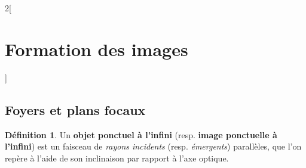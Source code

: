 \documentclass[french]{book}
\theoremstyle{definition}
\newtheorem*{definition}{Définition}
\theoremstyle{remark}
\newcommand*{\tdef}[1]{\textbf{#1}}
\newcommand*{\imp}[1]{\emph{#1}}
\begin{document}
\begin{landscape}
\begin{multicols*}{2}[\section{Formation des images}]
\subsection{Foyers et plans focaux}

\begin{definition}
Un \tdef{objet ponctuel à l'infini} (resp. \tdef{image ponctuelle à l'infini}) est un faisceau de \imp{rayons incidents} (resp. \imp{émergents}) parallèles, que l'on repère à l'aide de son inclinaison par rapport à l'axe optique.
\end{definition}


\end{multicols*}
\end{landscape}
\end{document}
